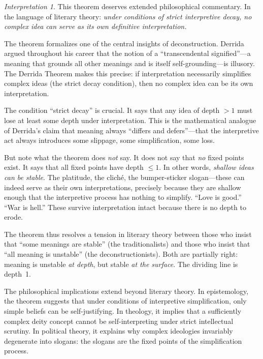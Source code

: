 \documentclass[11pt,openany]{book}
\theoremstyle{definition}
\theoremstyle{plain}
\theoremstyle{remark}
\newtheorem{interpretation}[axiom]{Interpretation}
\begin{document}
\begin{interpretation}
This theorem deserves extended philosophical commentary. In the language of literary theory: \emph{under conditions of strict interpretive decay, no complex idea can serve as its own definitive interpretation.}

The theorem formalizes one of the central insights of deconstruction. Derrida argued throughout his career that the notion of a ``transcendental signified''---a meaning that grounds all other meanings and is itself self-grounding---is illusory. The Derrida Theorem makes this precise: if interpretation necessarily simplifies complex ideas (the strict decay condition), then no complex idea can be its own interpretation.

The condition ``strict decay'' is crucial. It says that any idea of depth $> 1$ must lose at least some depth under interpretation. This is the mathematical analogue of Derrida's claim that meaning always ``differs and defers''---that the interpretive act always introduces some slippage, some simplification, some loss.

But note what the theorem does \emph{not} say. It does not say that \emph{no} fixed points exist. It says that all fixed points have depth $\leq 1$. In other words, \emph{shallow ideas can be stable}. The platitude, the cliché, the bumper-sticker slogan---these can indeed serve as their own interpretations, precisely because they are shallow enough that the interpretive process has nothing to simplify. ``Love is good.'' ``War is hell.'' These survive interpretation intact because there is no depth to erode.

The theorem thus resolves a tension in literary theory between those who insist that ``some meanings are stable'' (the traditionalists) and those who insist that ``all meaning is unstable'' (the deconstructionists). Both are partially right: meaning is unstable \emph{at depth}, but stable \emph{at the surface}. The dividing line is depth~1.

The philosophical implications extend beyond literary theory. In epistemology, the theorem suggests that under conditions of interpretive simplification, only simple beliefs can be self-justifying. In theology, it implies that a sufficiently complex deity concept cannot be self-interpreting under strict intellectual scrutiny. In political theory, it explains why complex ideologies invariably degenerate into slogans: the slogans are the fixed points of the simplification process.
\end{interpretation}
\end{document}
